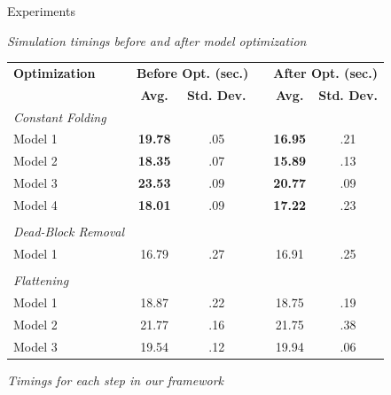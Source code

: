 \documentclass[final,hyperref={pdfpagelabels=false}]{beamer}
\begin{document}
\begin{frame}{}
\begin{columns}[t,totalwidth=\linewidth]
\begin{column}{.4\linewidth}
\begin{block}{Experiments}
             \begin{table}[h]
             \footnotesize \textit{Simulation timings before and after model optimization}\\
             \centering
             \begin{tabular}{l | c c p{1cm} c c }
             
             \textbf{Optimization} &\multicolumn{2}{c}{\textbf{Before Opt. (sec.)}}& &\multicolumn{2}{c}{\textbf{After Opt. (sec.)}} \\
              & \textbf{Avg.} & \textbf{Std. Dev.} && \textbf{Avg.} &\textbf{Std. Dev.}\\\hline
              
             \textit{Constant Folding} & & & & & \\
             Model 1 & \textbf{19.78} &.05 && \textbf{16.95} & .21\\
             Model 2 & \textbf{18.35} & .07 &&\textbf{ 15.89} & .13\\
             Model 3 &\textbf{ 23.53} & .09 && \textbf{20.77} & .09\\
             Model 4 & \textbf{18.01} & .09 && \textbf{17.22} & .23\\
              & & && & \\
             \textit{Dead-Block Removal} & && & & \\
             Model 1 & 16.79 & .27 && 16.91 & .25\\
              & & && & \\
             \textit{Flattening} & & && & \\
             Model 1 & 18.87 & .22 && 18.75 & .19\\
             Model 2 & 21.77 & .16 && 21.75 & .38\\
             Model 3 & 19.54 & .12 && 19.94 & .06\\
             
             \end{tabular}
             \centering
             
             \end{table}
             
             \begin{table}[h]
             \footnotesize \textit{Timings for each step in our framework}\\
	          \centering
	          \begin{tabular}{l | c c }
	          

\end{tabular}
\end{table}
\end{block}
\end{column}
\end{columns}
\end{frame}
\end{document}
